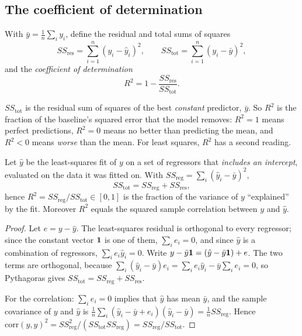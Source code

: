 \begin{notechapter}
\subsection{The coefficient of determination}

\begin{definition}[$R^2$]
With $\bar y = \frac1n\sum_iy_i$, define the residual and total sums of squares
\[
  SS_{\mathrm{res}} = \sum_{i=1}^n(y_i - \hat y_i)^2,\qquad
  SS_{\mathrm{tot}} = \sum_{i=1}^n(y_i - \bar y)^2,
\]
and the \emph{coefficient of determination}
\[
  R^2 = 1 - \frac{SS_{\mathrm{res}}}{SS_{\mathrm{tot}}} .
\]
\end{definition}

$SS_{\mathrm{tot}}$ is the residual sum of squares of the best \emph{constant}
predictor, $\bar y$. So $R^2$ is the fraction of the baseline's squared error
that the model removes: $R^2 = 1$ means perfect predictions, $R^2 = 0$ means no
better than predicting the mean, and $R^2 < 0$ means \emph{worse} than the
mean. For least squares, $R^2$ has a second reading.

\begin{proposition}\label{measuring-performance:prop:anova}
Let $\hat y$ be the least-squares fit of $y$ on a set of regressors that
\emph{includes an intercept}, evaluated on the data it was fitted on. With
$SS_{\mathrm{reg}} = \sum_i(\hat y_i - \bar y)^2$,
\[
  SS_{\mathrm{tot}} = SS_{\mathrm{reg}} + SS_{\mathrm{res}},
\]
hence $R^2 = SS_{\mathrm{reg}}/SS_{\mathrm{tot}}\in[0,1]$ is the fraction of the
variance of $y$ ``explained'' by the fit. Moreover $R^2$ equals the squared
sample correlation between $y$ and $\hat y$.
\end{proposition}

\begin{proof}
Let $e = y - \hat y$. The least-squares residual is orthogonal to every
regressor; since the constant vector $\mathbf{1}$ is one of them, $\sum_ie_i = 0$,
and since $\hat y$ is a combination of regressors, $\sum_ie_i\hat y_i = 0$.
Write $y - \bar y\mathbf{1} = (\hat y - \bar y\mathbf{1}) + e$. The two terms are
orthogonal, because
$\sum_i(\hat y_i - \bar y)e_i = \sum_ie_i\hat y_i - \bar y\sum_ie_i = 0$, so
Pythagoras gives $SS_{\mathrm{tot}} = SS_{\mathrm{reg}} + SS_{\mathrm{res}}$.

For the correlation: $\sum_ie_i = 0$ implies that $\hat y$ has mean $\bar y$, and
the sample covariance of $y$ and $\hat y$ is
$\frac1n\sum_i(\hat y_i - \bar y + e_i)(\hat y_i - \bar y) = \frac1nSS_{\mathrm{reg}}$.
Hence $\mathrm{corr}(y,\hat y)^2 = SS_{\mathrm{reg}}^2/(SS_{\mathrm{tot}}SS_{\mathrm{reg}}) = SS_{\mathrm{reg}}/SS_{\mathrm{tot}}$.
\end{proof}


\end{notechapter}
